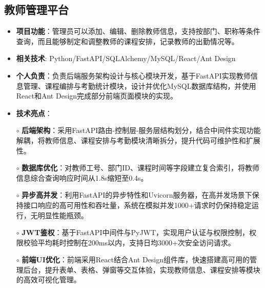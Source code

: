 \subsection{\textbf{教师管理平台} \hspace{2cm}{2024.07 -- 2024.09}}
  \begin{normalsize}
    \begin{itemize}
    \item \textbf{项目功能}：管理员可以添加、编辑、删除教师信息，支持按部门、职称等条件查询，而且能够制定和调整教师的课程安排，记录教师的出勤情况等。
    \item \textbf{相关技术}: Python/FastAPI/SQLAlchemy/MySQL/React/Ant Design
    \item \textbf{个人负责}：负责后端服务架构设计与核心模块开发，基于FastAPI实现教师信息管理、课程编排与考勤统计模块，设计并优化MySQL数据库结构，并使用React和Ant Design完成部分前端页面模块的实现。
    \item \textbf{技术亮点}：
    \setlength{\itemindent}{1em} %
      \item[$\circ$] \textbf{后端架构}：采用FastAPI路由-控制层-服务层结构划分，结合中间件实现功能解耦，将教师信息、课程安排与考勤模块清晰拆分，提升代码可维护性和扩展性。
      \item[$\circ$] \textbf{数据库优化}：对教师工号、部门ID、课程时间等字段建立复合索引，将教师信息综合查询响应时间从1.8s缩短至0.4s。
      \item[$\circ$] \textbf{异步高并发}：利用FastAPI的异步特性和Uvicorn服务器，在高并发场景下保持接口响应的高可用性和吞吐量，系统在模拟并发1000+请求时仍保持稳定运行，无明显性能瓶颈。
      \item[$\circ$] \textbf{JWT鉴权}：基于FastAPI中间件与PyJWT，实现用户认证与权限控制，权限校验平均耗时控制在200ms以内，支持日均3000+次安全访问请求。
      \item[$\circ$] \textbf{前端UI优化}：前端采用React结合Ant Design组件库，快速搭建高可用的管理后台，提升表单、表格、弹窗等交互体验，实现教师信息、课程安排等模块的高效可视化管理。
    \end{itemize}
  \end{normalsize}